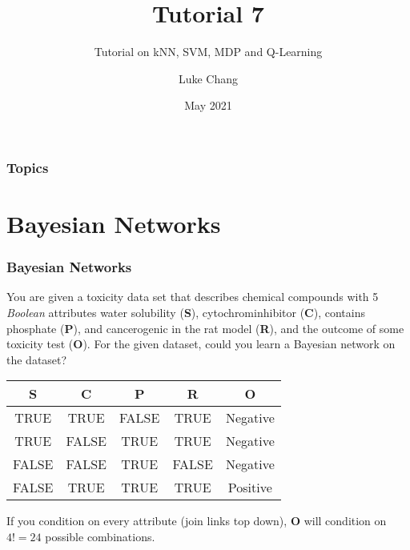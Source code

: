 \documentclass[aspectratio=169, 10pt]{beamer}
\title{Tutorial 7}
\subtitle{Tutorial on kNN, SVM, MDP and Q-Learning}
\author{Luke Chang}
\institute{The University of Auckland}
\date{May 2021}
\begin{document}
\frame{\titlepage}

\begin{frame}
    \frametitle{Topics}

    \tableofcontents
        
\end{frame}

\section{Bayesian Networks}
\begin{frame}[t]
    \frametitle{Bayesian Networks}

    \begin{example}
        You are given a toxicity data set that describes chemical compounds with 5 \textit{Boolean}
        attributes water solubility (\textbf{S}), cytochrominhibitor (\textbf{C}), contains phosphate (\textbf{P}), and
        cancerogenic in the rat model (\textbf{R}), and the outcome of some toxicity test (\textbf{O}). For the given
        dataset, could you learn a Bayesian network on the dataset?
    \end{example}
    
    \begin{table}[]
        \small
        \begin{tabular}{cccc|c}
        \textbf{S} & \textbf{C} & \textbf{P} & \textbf{R} & \textbf{O} \\ \hline
        TRUE       & TRUE       & FALSE      & TRUE       & Negative   \\
        TRUE       & FALSE      & TRUE       & TRUE       & Negative   \\
        FALSE      & FALSE      & TRUE       & FALSE      & Negative   \\
        FALSE      & TRUE       & TRUE       & TRUE       & Positive  
        \end{tabular}
    \end{table}

    \vspace{2em}
    If you condition on every attribute (join links top down), \textbf{O} will condition on $4!=24$ possible combinations.
\end{frame}

\end{document}
